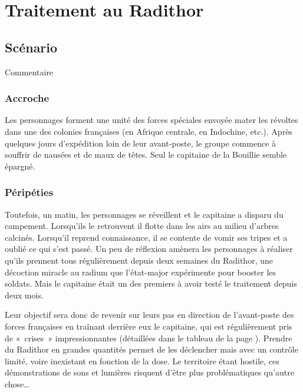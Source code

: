 \chapter{Traitement au Radithor}

\section{Scénario}

Commentaire

\subsection{Accroche}

Les personnages forment une unité des forces spéciales envoyée mater les révoltes dans une des colonies françaises (en Afrique centrale, en Indochine, etc.). Après quelques jours d'expédition loin de leur avant-poste, le groupe commence à souffrir de nausées et de maux de têtes. Seul le capitaine de la Bouillie semble épargné.

\subsection{Péripéties}

Toutefois, un matin, les personnages se réveillent et le capitaine a disparu du campement. Lorsqu'ils le retrouvent il flotte dans les airs au milieu d'arbres calcinés. Lorsqu'il reprend connaissance, il se contente de vomir ses tripes et a oublié ce qui s'est passé. Un peu de réflexion amènera les personnages à réaliser qu'ils prennent tous régulièrement depuis deux semaines du Radithor, une décoction miracle au radium que l'état-major expérimente pour booster les soldats. Mais le capitaine était un des premiers à avoir testé le traitement depuis deux mois.

Leur objectif sera donc de revenir sur leurs pas en direction de l'avant-poste des forces françaises en traînant derrière eux le capitaine, qui est régulièrement pris de « crises » impressionnantes (détaillées dans le tableau de la page \pageref{table:radithor}). Prendre du Radithor en grandes quantités permet de les déclencher mais avec un contrôle limité, voire inexistant en fonction de la dose. Le territoire étant hostile, ces démonstrations de sons et lumières risquent d'être plus problématiques qu'autre chose…

